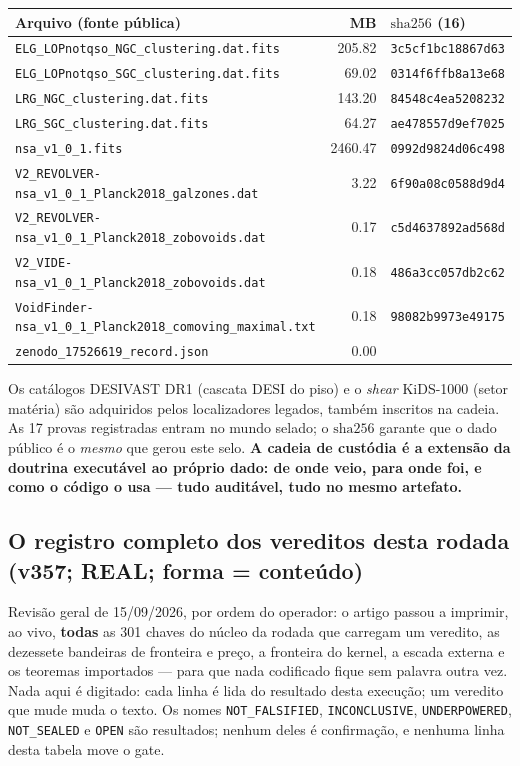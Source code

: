 \documentclass[11pt]{article}
\theoremstyle{definition}\newtheorem{deriv}{Derivação}
\begin{document}
\begin{center}\footnotesize\begin{longtable}{@{}p{}rl@{}}\toprule Arquivo (fonte pública) & MB & $\mathrm{sha}256$ (16) \\ \midrule\endhead \texttt{ELG\_LOPnotqso\_NGC\_clustering.dat.fits} & 205.82 & \texttt{3c5cf1bc18867d63} \\  \texttt{ELG\_LOPnotqso\_SGC\_clustering.dat.fits} & 69.02 & \texttt{0314f6ffb8a13e68} \\  \texttt{LRG\_NGC\_clustering.dat.fits} & 143.20 & \texttt{84548c4ea5208232} \\  \texttt{LRG\_SGC\_clustering.dat.fits} & 64.27 & \texttt{ae478557d9ef7025} \\  \texttt{nsa\_v1\_0\_1.fits} & 2460.47 & \texttt{0992d9824d06c498} \\  \texttt{V2\_REVOLVER-nsa\_v1\_0\_1\_Planck2018\_galzones.dat} & 3.22 & \texttt{6f90a08c0588d9d4} \\  \texttt{V2\_REVOLVER-nsa\_v1\_0\_1\_Planck2018\_zobovoids.dat} & 0.17 & \texttt{c5d4637892ad568d} \\  \texttt{V2\_VIDE-nsa\_v1\_0\_1\_Planck2018\_zobovoids.dat} & 0.18 & \texttt{486a3cc057db2c62} \\  \texttt{VoidFinder-nsa\_v1\_0\_1\_Planck2018\_comoving\_maximal.txt} & 0.18 & \texttt{98082b9973e49175} \\  \texttt{zenodo\_17526619\_record.json} & 0.00 & \texttt{} \\ \bottomrule\end{longtable}\end{center}

Os catálogos DESIVAST DR1 (cascata DESI do piso) e o \emph{shear} KiDS-1000 (setor matéria) são adquiridos pelos localizadores legados, também inscritos na cadeia. As 17 provas registradas entram no mundo selado; o $\mathrm{sha}256$ garante que o dado público é o \emph{mesmo} que gerou este selo. \textbf{A cadeia de custódia é a extensão da doutrina executável ao próprio dado: de onde veio, para onde foi, e como o código o usa --- tudo auditável, tudo no mesmo artefato.}

\subsection*{O registro completo dos vereditos desta rodada (v357; REAL; forma = conteúdo)}

Revisão geral de 15/09/2026, por ordem do operador: o artigo passou a imprimir, ao vivo, \textbf{todas} as 301 chaves do núcleo da rodada que carregam um veredito, as dezessete bandeiras de fronteira e preço, a fronteira do kernel, a escada externa e os teoremas importados --- para que nada codificado fique sem palavra outra vez. Nada aqui é digitado: cada linha é lida do resultado desta execução; um veredito que mude muda o texto. Os nomes \texttt{NOT\_FALSIFIED}, \texttt{INCONCLUSIVE}, \texttt{UNDERPOWERED}, \texttt{NOT\_SEALED} e \texttt{OPEN} são resultados; nenhum deles é confirmação, e nenhuma linha desta tabela move o gate.
\end{document}
